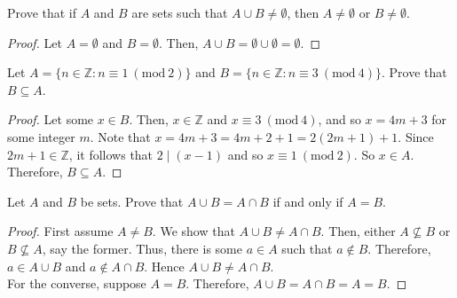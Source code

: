 \documentclass[12pt]{article}
\newcommand{\Z}{\mathbb{Z}}
\newcommand{\Mod}[1]{\ (\mathrm{mod}\ #1)}
\newenvironment{problem}[2][Problem]{\begin{trivlist}
		\item[\hskip \labelsep {\bfseries #1}\hskip \labelsep {\bfseries #2.}]}{\end{trivlist}}
\begin{document}
	\begin{problem}{44}
		Prove that if $A$ and $B$ are sets such that $A\cup B \neq \emptyset$, then $A\neq \emptyset$ or $B\neq \emptyset$.
		\begin{proof}
			Let $A = \emptyset$ and $B = \emptyset$. Then, $A\cup B = \emptyset\cup \emptyset = \emptyset$.
		\end{proof}
	\end{problem}

	\begin{problem}{45}
		Let $A=\{n\in\Z: n\equiv 1 \Mod 2\}$ and $B=\{n\in \Z: n\equiv 3 \Mod 4\}$. Prove that $B\subseteq A$.
		\begin{proof}
			 Let some $x\in B$. Then, $x\in \Z$ and $x \equiv 3 \Mod 4$, and so $x = 4m + 3$ for some integer $m$. Note that $x = 4m + 3 = 4m + 2 +1 = 2(2m+1)+1$. Since $2m+1\in \Z$, it follows that $2\mid (x-1)$ and so $x \equiv 1 \Mod 2$. So $x \in A$. Therefore, $B\subseteq A$.
		\end{proof}
	\end{problem}

	\begin{problem}{46}
		Let $A$ and $B$ be sets. Prove that $A\cup B = A\cap B$ if and only if $A=B$.
		\begin{proof}
			First assume $A\neq B$. We show that $A\cup B \neq A\cap B$. Then, either $A\not\subseteq B$ or $B\not\subseteq A$, say the former. Thus, there is some $a\in A$ such that $a\not\in B$. Therefore, $a\in A\cup B$ and $a\not\in A\cap B$. Hence $A\cup B \neq A\cap B$.\\
			For the converse, suppose $A=B$. Therefore, $A\cup B = A\cap B = A = B$.
		\end{proof}
	\end{problem}
\end{document}
